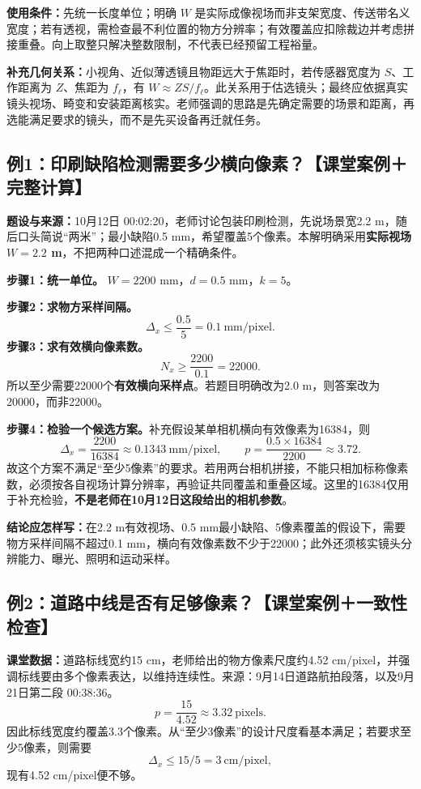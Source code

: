 \textbf{使用条件：}先统一长度单位；明确 $W$ 是实际成像视场而非支架宽度、传送带名义宽度；若有透视，需检查最不利位置的物方分辨率；有效覆盖应扣除裁边并考虑拼接重叠。向上取整只解决整数限制，不代表已经预留工程裕量。

\textbf{补充几何关系：}小视角、近似薄透镜且物距远大于焦距时，若传感器宽度为 $S$、工作距离为 $Z$、焦距为 $f_{\ell}$，有 $W\approx ZS/f_{\ell}$。此关系用于估选镜头；最终应依据真实镜头视场、畸变和安装距离核实。老师强调的思路是先确定需要的场景和距离，再选能满足要求的镜头，而不是先买设备再迁就任务。

\subsection{例1：印刷缺陷检测需要多少横向像素？【课堂案例＋完整计算】}
\textbf{题设与来源：}10月12日 00:02:20，老师讨论包装印刷检测，先说场景宽2.2 m，随后口头简说“两米”；最小缺陷0.5 mm，希望覆盖5个像素。本解明确采用\textbf{实际视场 $W=2.2$ m}，不把两种口述混成一个精确条件。

\textbf{步骤1：统一单位。} $W=2200$ mm，$d=0.5$ mm，$k=5$。

\textbf{步骤2：求物方采样间隔。}
\[
\Delta_x\leq\frac{0.5}{5}=0.1\ \mathrm{mm/pixel}.
\]
\textbf{步骤3：求有效横向像素数。}
\[
N_x\geq\frac{2200}{0.1}=22000.
\]
所以至少需要22000个\textbf{有效横向采样点}。若题目明确改为2.0 m，则答案改为20000，而非22000。

\textbf{步骤4：检验一个候选方案。}补充假设某单相机横向有效像素为16384，则
\[
\Delta_x=\frac{2200}{16384}\approx0.1343\ \mathrm{mm/pixel},\qquad
p=\frac{0.5\times16384}{2200}\approx3.72.
\]
故这个方案不满足“至少5像素”的要求。若用两台相机拼接，不能只相加标称像素数，必须按各自视场计算分辨率，再验证共同覆盖和重叠区域。这里的16384仅用于补充检验，\textbf{不是老师在10月12日这段给出的相机参数}。

\textbf{结论应怎样写：}在2.2 m有效视场、0.5 mm最小缺陷、5像素覆盖的假设下，需要物方采样间隔不超过0.1 mm，横向有效像素数不少于22000；此外还须核实镜头分辨能力、曝光、照明和运动采样。

\subsection{例2：道路中线是否有足够像素？【课堂案例＋一致性检查】}
\textbf{课堂数据：}道路标线宽约15 cm，老师给出的物方像素尺度约4.52 cm/pixel，并强调标线要由多个像素表达，以维持连续性。来源：9月14日道路航拍段落，以及9月21日第二段 00:38:36。
\[
p=\frac{15}{4.52}\approx3.32\ \mathrm{pixels}.
\]
因此标线宽度约覆盖3.3个像素。从“至少3像素”的设计尺度看基本满足；若要求至少5像素，则需要
\[
\Delta_x\leq15/5=3\ \mathrm{cm/pixel},
\]
现有4.52 cm/pixel便不够。

